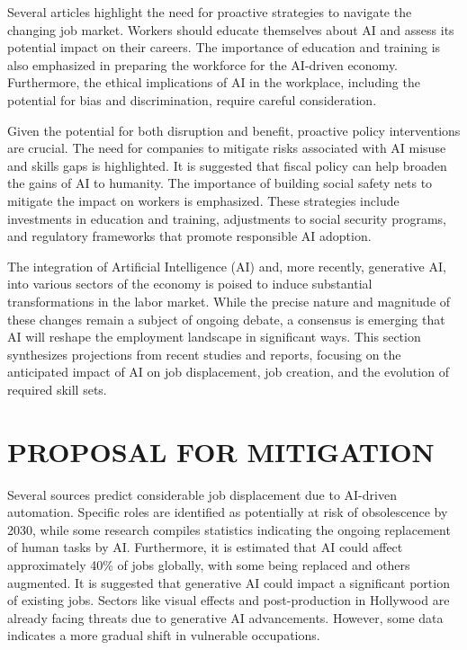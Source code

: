 \documentclass[a4paper,headinclude=on,footinclude=on,12pt,oneside]{scrbook}
\begin{document}

Several articles highlight the need for proactive strategies to navigate the changing job market. Workers should educate themselves about AI and assess its potential impact on their careers. The importance of education and training is also emphasized in preparing the workforce for the AI-driven economy. Furthermore, the ethical implications of AI in the workplace, including the potential for bias and discrimination, require careful consideration.


Given the potential for both disruption and benefit, proactive policy interventions are crucial. The need for companies to mitigate risks associated with AI misuse and skills gaps is highlighted. It is suggested that fiscal policy can help broaden the gains of AI to humanity. The importance of building social safety nets to mitigate the impact on workers is emphasized. These strategies include investments in education and training, adjustments to social security programs, and regulatory frameworks that promote responsible AI adoption.


The integration of Artificial Intelligence (AI) and, more recently, generative AI, into various sectors of the economy is poised to induce substantial transformations in the labor market. While the precise nature and magnitude of these changes remain a subject of ongoing debate, a consensus is emerging that AI will reshape the employment landscape in significant ways. This section synthesizes projections from recent studies and reports, focusing on the anticipated impact of AI on job displacement, job creation, and the evolution of required skill sets.

\section{PROPOSAL FOR MITIGATION}


Several sources predict considerable job displacement due to AI-driven automation. Specific roles are identified as potentially at risk of obsolescence by 2030, while some research compiles statistics indicating the ongoing replacement of human tasks by AI. Furthermore, it is estimated that AI could affect approximately 40\% of jobs globally, with some being replaced and others augmented. It is suggested that generative AI could impact a significant portion of existing jobs. Sectors like visual effects and post-production in Hollywood are already facing threats due to generative AI advancements. However, some data indicates a more gradual shift in vulnerable occupations.
\end{document}
